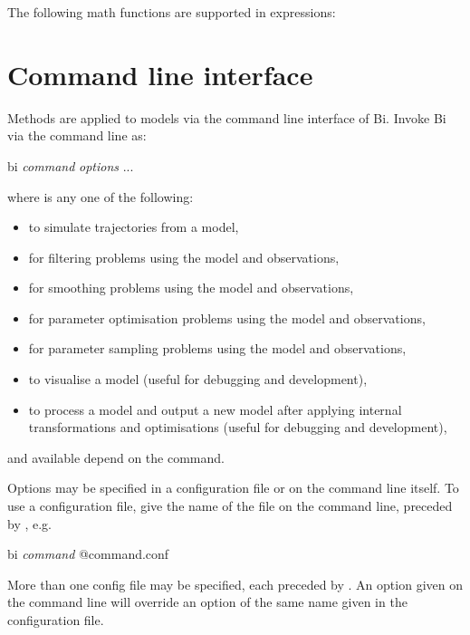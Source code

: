 The following math functions are supported in expressions:


\section{Command line interface\label{Command_line_interface}}

Methods are applied to models via the command line interface of Bi. Invoke Bi
via the command line as:
\begin{cmdcode}
bi \textit{command} \textit{options} ...
\end{cmdcode}
where  is any one of the following:
\begin{itemize}
\item {} to simulate trajectories
  from a model,
\item {} for filtering problems using the
  model and observations,
\item {} for smoothing problems using the
  model and observations,
\item {} for parameter optimisation
  problems using the model and observations,
\item {} for parameter sampling
  problems using the model and observations,
\item {} to visualise a model (useful for
  debugging and development),
\item {} to process a model and
  output a new model after applying internal transformations and optimisations
  (useful for debugging and development),
\end{itemize}
and available  depend on the command.

Options may be specified in a configuration file or on the
command line itself. To use a configuration file, give the name of the file on
the command line, preceded by , e.g.
\begin{cmdcode}
bi \textit{command} @command.conf
\end{cmdcode}

More than one config file may be specified, each preceded by . An
option given on the command line will override an option of the same name
given in the configuration file.

